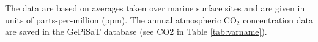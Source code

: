 The data are based on averages taken over marine surface sites and are given in units of parts-per-million (ppm). 
The annual atmospheric CO$_2$ concentration data are saved in the GePiSaT database (see CO2 in Table \ref{tab:varname}).

